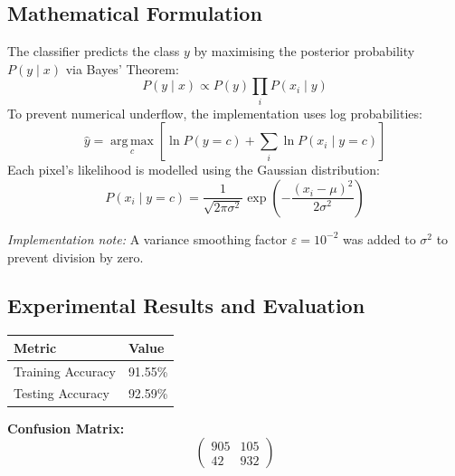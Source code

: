 \documentclass[11pt,a4paper]{article}
\begin{document}
\subsection{Mathematical Formulation}
The classifier predicts the class $y$ by maximising the posterior probability $P(y \mid x)$ via Bayes' Theorem:
\[
P(y \mid x) \propto P(y) \prod_{i} P(x_i \mid y)
\]
To prevent numerical underflow, the implementation uses log probabilities:
\[
\hat{y} = \operatorname*{arg\,max}_{c} \left[ \ln P(y=c) + \sum_{i} \ln P(x_i \mid y=c) \right]
\]
Each pixel's likelihood is modelled using the Gaussian distribution:
\[
P(x_i \mid y=c) = \frac{1}{\sqrt{2\pi\sigma^2}} \exp\!\left(-\frac{(x_i - \mu)^2}{2\sigma^2}\right)
\]

\noindent\textit{Implementation note:} A variance smoothing factor $\varepsilon = 10^{-2}$ was added to $\sigma^2$ to prevent division by zero.

\subsection{Experimental Results and Evaluation}

\begin{center}
\begin{tabular}{ll}
\toprule
\textbf{Metric} & \textbf{Value} \\
\midrule
Training Accuracy & 91.55\% \\
Testing Accuracy  & 92.59\% \\
\bottomrule
\end{tabular}
\end{center}

\noindent\textbf{Confusion Matrix:}
\[
\begin{pmatrix} 905 & 105 \\ 42 & 932 \end{pmatrix}
\]
\end{document}
